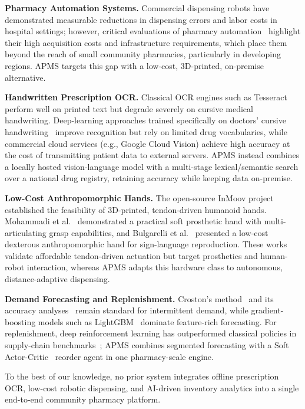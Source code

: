 \documentclass[conference]{IEEEtran}
\begin{document}
\textbf{Pharmacy Automation Systems.} Commercial dispensing robots have demonstrated measurable reductions in dispensing errors and labor costs in hospital settings; however, critical evaluations of pharmacy automation~\cite{pharmacy_automation} highlight their high acquisition costs and infrastructure requirements, which place them beyond the reach of small community pharmacies, particularly in developing regions. APMS targets this gap with a low-cost, 3D-printed, on-premise alternative.

\textbf{Handwritten Prescription OCR.} Classical OCR engines such as Tesseract~\cite{tesseract} perform well on printed text but degrade severely on cursive medical handwriting. Deep-learning approaches trained specifically on doctors' cursive handwriting~\cite{cursive_dl} improve recognition but rely on limited drug vocabularies, while commercial cloud services (e.g., Google Cloud Vision) achieve high accuracy at the cost of transmitting patient data to external servers. APMS instead combines a locally hosted vision-language model with a multi-stage lexical/semantic search over a national drug registry, retaining accuracy while keeping data on-premise.

\textbf{Low-Cost Anthropomorphic Hands.} The open-source InMoov project~\cite{inmoov} established the feasibility of 3D-printed, tendon-driven humanoid hands. Mohammadi et al.~\cite{prosthetic} demonstrated a practical soft prosthetic hand with multi-articulating grasp capabilities, and Bulgarelli et al.~\cite{sign_hand} presented a low-cost dexterous anthropomorphic hand for sign-language reproduction. These works validate affordable tendon-driven actuation but target prosthetics and human-robot interaction, whereas APMS adapts this hardware class to autonomous, distance-adaptive dispensing.

\textbf{Demand Forecasting and Replenishment.} Croston's method~\cite{croston} and its accuracy analyses~\cite{syntetos} remain standard for intermittent demand, while gradient-boosting models such as LightGBM~\cite{lightgbm} dominate feature-rich forecasting. For replenishment, deep reinforcement learning has outperformed classical policies in supply-chain benchmarks~\cite{beer_game}; APMS combines segmented forecasting with a Soft Actor-Critic~\cite{sac} reorder agent in one pharmacy-scale engine.

To the best of our knowledge, no prior system integrates offline prescription OCR, low-cost robotic dispensing, and AI-driven inventory analytics into a single end-to-end community pharmacy platform.
\end{document}
